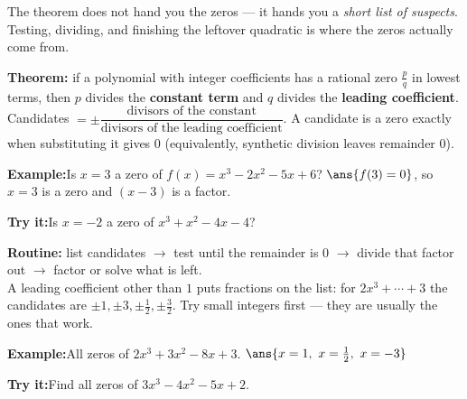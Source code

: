\documentclass[12pt]{article}
\begin{document}

\noindent\small The theorem does not hand you the zeros --- it hands you a
\emph{short list of suspects}. Testing, dividing, and finishing the leftover
quadratic is where the zeros actually come from.\normalsize

\begin{formulabox}
\textbf{Theorem:} if a polynomial with integer coefficients has a rational zero
$\frac{p}{q}$ in lowest terms, then $p$ divides the \textbf{constant term} and
$q$ divides the \textbf{leading coefficient}.\\[3pt]
Candidates $= \pm\dfrac{\text{divisors of the constant}}{\text{divisors of the
leading coefficient}}$. \quad A candidate is a zero exactly when substituting it
gives $0$ (equivalently, synthetic division leaves remainder $0$).
\end{formulabox}
\begin{examplebox}
\textbf{Example:}\quad Is $x = 3$ a zero of $f(x) = x^3 - 2x^2 - 5x + 6$?
$\ans{f(3) = 0}$, so $x = 3$ is a zero and $(x-3)$ is a factor.
\end{examplebox}
\begin{tryitbox}
\textbf{Try it:}\quad Is $x = -2$ a zero of $x^3 + x^2 - 4x - 4$?\\[2pt]
\end{tryitbox}

\begin{formulabox}
\textbf{Routine:} list candidates $\to$ test until the remainder is $0$ $\to$
divide that factor out $\to$ factor or solve what is left.\\[3pt]
A leading coefficient other than $1$ puts fractions on the list: for
$2x^3 + \cdots + 3$ the candidates are $\pm1, \pm3, \pm\frac{1}{2},
\pm\frac{3}{2}$. Try small integers first --- they are usually the ones that
work.
\end{formulabox}
\begin{examplebox}
\textbf{Example:}\quad All zeros of $2x^3 + 3x^2 - 8x + 3$.
$\ans{x = 1,\ x = \tfrac{1}{2},\ x = -3}$
\end{examplebox}
\begin{tryitbox}
\textbf{Try it:}\quad Find all zeros of $3x^3 - 4x^2 - 5x + 2$.\\[2pt]
\end{tryitbox}
\end{document}
